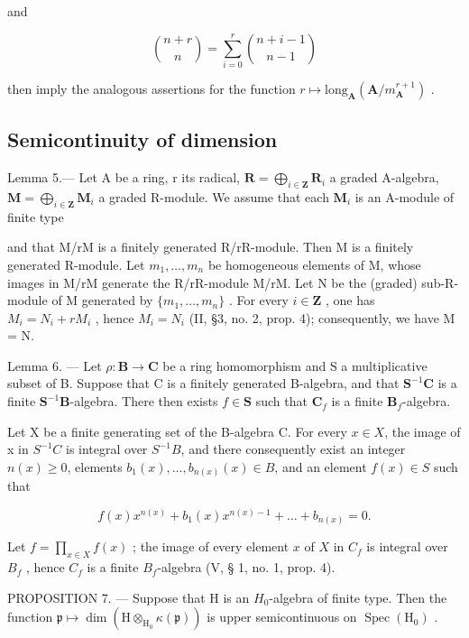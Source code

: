and

\[
\binom {n + r} {n} = \sum_ {i = 0} ^ {r} \binom {n + i - 1} {n - 1}
\]

then imply the analogous assertions for the function \(r \mapsto \text{long}_{\mathbf{A}}(\mathbf{A}/m_{\mathbf{A}}^{r+1})\) .

\subsection{Semicontinuity of dimension}

Lemma 5.--- Let A be a ring, r its radical, \(\mathbf{R} = \bigoplus_{i \in \mathbf{Z}} \mathbf{R}_i\) a graded A-algebra, \(\mathbf{M} = \bigoplus_{i \in \mathbf{Z}} \mathbf{M}_i\) a graded R-module. We assume that each \(\mathbf{M}_i\) is an A-module of finite type

and that M/rM is a finitely generated R/rR-module. Then M is a finitely generated R-module. Let \(m_{1}, \ldots, m_{n}\) be homogeneous elements of M, whose images in M/rM generate the R/rR-module M/rM. Let N be the (graded) sub-R-module of M generated by \(\{m_{1}, \ldots, m_{n}\}\) . For every \(i \in \mathbf{Z}\) , one has \(M_{i} = N_{i} + rM_{i}\) , hence \(M_{i} = N_{i}\) (II, §3, no. 2, prop. 4); consequently, we have M = N.

Lemma 6. --- Let \(\rho: \mathbf{B} \to \mathbf{C}\) be a ring homomorphism and S a multiplicative subset of B. Suppose that C is a finitely generated B-algebra, and that \(\mathbf{S}^{-1}\mathbf{C}\) is a finite \(\mathbf{S}^{-1}\mathbf{B}\)-algebra. There then exists \(f \in \mathbf{S}\) such that \(\mathbf{C}_f\) is a finite \(\mathbf{B}_f\)-algebra.

Let X be a finite generating set of the B-algebra C. For every \(x \in X\), the image of x in \(S^{-1}C\) is integral over \(S^{-1}B\), and there consequently exist an integer \(n(x) \geqslant 0\), elements \(b_{1}(x), \ldots, b_{n(x)}(x) \in B\), and an element \(f(x) \in S\) such that

\[
f (x) x ^ {n (x)} + b _ {1} (x) x ^ {n (x) - 1} + \dots + b _ {n (x)} = 0.
\]

Let \(f = \prod_{x \in X} f(x)\) ; the image of every element \(x\) of \(X\) in \(C_f\) is integral over \(B_f\) , hence \(C_f\) is a finite \(B_f\)-algebra (V, § 1, no. 1, prop. 4).

PROPOSITION 7. — Suppose that H is an \(H_{0}\)-algebra of finite type. Then the function \(\mathfrak{p} \mapsto \dim(\mathrm{H} \otimes_{\mathrm{H}_{0}} \kappa(\mathfrak{p}))\) is upper semicontinuous on \(\operatorname{Spec}(\mathrm{H}_{0})\) .

